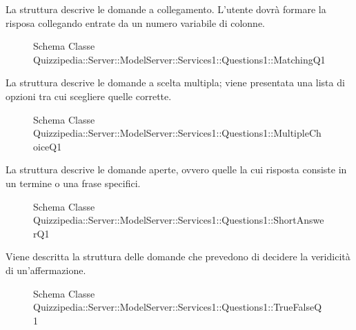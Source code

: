 La struttura descrive le domande a collegamento. L'utente dovrà formare la risposa collegando entrate da un numero variabile di colonne.
\begin{figure}[H]
\centering
\noindent{}
\caption{Schema Classe Quizzipedia::Server::ModelServer::Services1::Questions1::MatchingQ1}
\end{figure}
La struttura descrive le domande a scelta multipla; viene presentata una lista di opzioni tra cui scegliere quelle corrette.
\begin{figure}[H]
\centering
\noindent{}
\caption{Schema Classe Quizzipedia::Server::ModelServer::Services1::Questions1::MultipleChoiceQ1}
\end{figure}
La struttura descrive le domande aperte, ovvero quelle la cui risposta consiste in un termine o una frase specifici.
\begin{figure}[H]
\centering
\noindent{}
\caption{Schema Classe Quizzipedia::Server::ModelServer::Services1::Questions1::ShortAnswerQ1}
\end{figure}
Viene descritta la struttura delle domande che prevedono di decidere la veridicità di un'affermazione.
\begin{figure}[H]
\centering
\noindent{}
\caption{Schema Classe Quizzipedia::Server::ModelServer::Services1::Questions1::TrueFalseQ1}
\end{figure}
